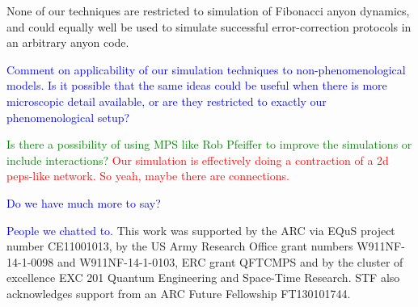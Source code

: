 \documentclass[aps, prl, letterpaper, twocolumn, superscriptaddress, notitlepage, 10pt]{revtex4-1}
\newcommand{\cggb}[1]{\textcolor{blue}{#1}}
\newcommand{\dude}[1]{\textcolor{red}{#1}}
\newcommand{\stf}[1]{\textcolor{green}{#1}}
\begin{document}
None of our techniques are restricted to simulation of Fibonacci anyon dynamics, and could 
equally well be used to simulate successful error-correction protocols in an arbitrary anyon 
code.	

\cggb{Comment on applicability of our simulation techniques to non-phenomenological 
models. Is it possible that the same ideas could be useful when there is more microscopic 
detail available, or are they restricted to exactly our phenomenological setup?}

\stf{Is there a possibility of using MPS like Rob Pfeiffer to improve the simulations or 
include interactions?}
\dude{Our simulation is effectively doing a contraction of a 2d peps-like network. So
yeah, maybe there are connections.}

\cggb{Do we have much more to say?}


\acknowledgments 

\cggb {People we chatted to.} 
This work was supported by the ARC via EQuS project number CE11001013, by the US Army Research Office grant numbers W911NF-14-1-0098 and W911NF-14-1-0103, ERC grant QFTCMPS and by the cluster of excellence EXC 201 Quantum Engineering and Space-Time Research. STF also acknowledges support from an ARC Future Fellowship FT130101744.


\end{document}

